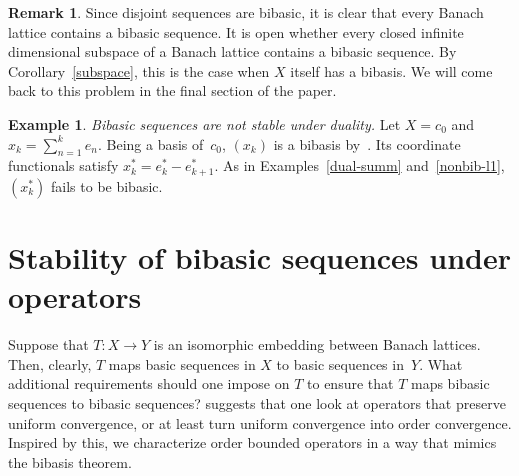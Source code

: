 \documentclass[12pt]{amsart}
\theoremstyle{plain}
\newtheorem{proposition}[theorem]{Proposition}
\theoremstyle{definition}
\newtheorem{remark}[theorem]{Remark}
\newtheorem{example}[theorem]{Example}
\begin{document}
\begin{remark}
  Since disjoint sequences are bibasic, it is clear that every Banach
  lattice contains a bibasic sequence. It is open whether every closed
  infinite dimensional subspace of a Banach lattice contains a bibasic
  sequence. By Corollary~\ref{subspace}, this is the case when $X$
  itself has a bibasis.  We will come back to this problem in the
  final section of the paper.
\end{remark}

\begin{example}
  \emph{Bibasic sequences are not stable under duality.} Let $X=c_0$
  and $x_k=\sum_{n=1}^ke_n$. Being a basis of~$c_0$, $(x_k)$ is
  a bibasis by~. Its coordinate functionals
  satisfy $x_k^*=e_k^*-e_{k+1}^*$. As in Examples~\ref{dual-summ}
  and~\ref{nonbib-l1}, $(x_k^*)$ fails to be bibasic.
\end{example}



\section{Stability of bibasic sequences under operators}

Suppose that $T\colon X\to Y$ is an isomorphic embedding between
Banach lattices. Then, clearly, $T$ maps basic sequences in $X$ to basic
sequences in~$Y$. What additional requirements should one impose on
$T$ to ensure that $T$ maps bibasic sequences to bibasic sequences?
 suggests that one look at operators that preserve
uniform convergence, or at least turn uniform convergence into order
convergence. Inspired by this, we characterize order bounded operators
in a way that mimics the bibasis theorem.


\end{document}
